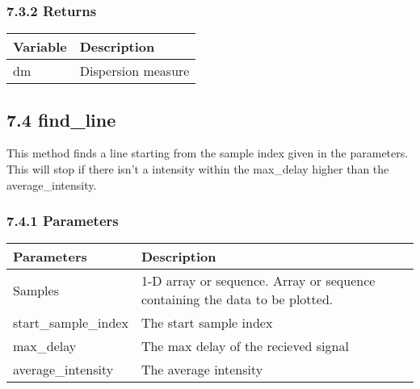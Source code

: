 \documentclass[]{article}
\begin{document}
\subsubsection{7.3.2 Returns}\label{returns-2}

\begin{longtable}[]{@{}ll@{}}
\toprule
Variable & Description\tabularnewline
\midrule
\endhead
dm & Dispersion measure\tabularnewline
\bottomrule
\end{longtable}

\subsection{7.4 find\_line}\label{find_line}

This method finds a line starting from the sample index given in the
parameters. This will stop if there isn't a intensity within the
max\_delay higher than the average\_intensity.

\subsubsection{7.4.1 Parameters}\label{parameters-6}

\begin{longtable}[]{@{}ll@{}}
\toprule
\begin{minipage}[b]{0.41\columnwidth}\raggedright\strut
Parameters\strut
\end{minipage} & \begin{minipage}[b]{0.41\columnwidth}\raggedright\strut
Description\strut
\end{minipage}\tabularnewline
\midrule
\endhead
\begin{minipage}[t]{0.41\columnwidth}\raggedright\strut
Samples\strut
\end{minipage} & \begin{minipage}[t]{0.41\columnwidth}\raggedright\strut
1-D array or sequence. Array or sequence containing the data to be
plotted.\strut
\end{minipage}\tabularnewline
\begin{minipage}[t]{0.41\columnwidth}\raggedright\strut
start\_sample\_index\strut
\end{minipage} & \begin{minipage}[t]{0.41\columnwidth}\raggedright\strut
The start sample index\strut
\end{minipage}\tabularnewline
\begin{minipage}[t]{0.41\columnwidth}\raggedright\strut
max\_delay\strut
\end{minipage} & \begin{minipage}[t]{0.41\columnwidth}\raggedright\strut
The max delay of the recieved signal\strut
\end{minipage}\tabularnewline
\begin{minipage}[t]{0.41\columnwidth}\raggedright\strut
average\_intensity\strut
\end{minipage} & \begin{minipage}[t]{0.41\columnwidth}\raggedright\strut
The average intensity\strut
\end{minipage}\tabularnewline
\bottomrule
\end{longtable}
\end{document}
